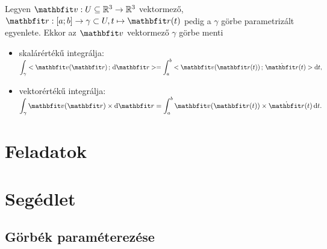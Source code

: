 \documentclass[lang=magyar]{math-handout}
\begin{document}
\vfill

\begin{definition}
  Legyen $\rvec v: U \subseteq \mathbb R^3 \rightarrow \mathbb R^3$ vektormező,
  $\rvec r: [a;b] \rightarrow \gamma \subset U, t \mapsto \rvec r(t)$ pedig a
  $\gamma$ görbe parametrizált egyenlete. Ekkor az $\rvec v$ vektormező $\gamma$
  görbe menti
  \begin{itemize}
    \item skalárértékű integrálja:
          \(
            \displaystyle
            \int_\gamma \scalar{\rvec v(\rvec r)}{\diff \rvec r} =
            \int_a^b \scalar{\rvec v(\rvec r(t))}{\dot{\rvec r}(t)} \diff t
            \text,
          \)
    \item vektorértékű integrálja:
          \(
            \displaystyle
            \int_\gamma \rvec v(\rvec r) \times \diff \rvec r =
            \int_a^b \rvec v(\rvec r(t)) \times \dot{\rvec r}(t) \, \diff t
            \text.
          \)
  \end{itemize}
\end{definition}

\clearpage
\section{Feladatok}

\clearpage
\section{Segédlet}

\subsection{Görbék paraméterezése}
\end{document}
